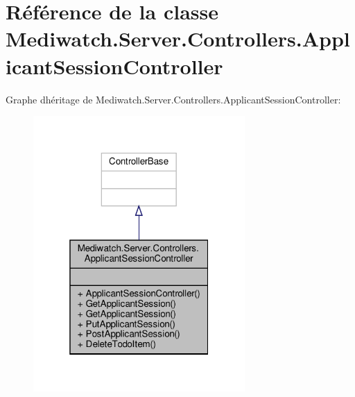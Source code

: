 \hypertarget{class_mediwatch_1_1_server_1_1_controllers_1_1_applicant_session_controller}{}\section{Référence de la classe Mediwatch.\+Server.\+Controllers.\+Applicant\+Session\+Controller}
\label{class_mediwatch_1_1_server_1_1_controllers_1_1_applicant_session_controller}


Graphe d\textquotesingle{}héritage de Mediwatch.\+Server.\+Controllers.\+Applicant\+Session\+Controller\+:\nopagebreak
\begin{figure}[H]
\begin{center}
\leavevmode
\includegraphics[width=229pt]{class_mediwatch_1_1_server_1_1_controllers_1_1_applicant_session_controller__inherit__graph}
\end{center}
\end{figure}


